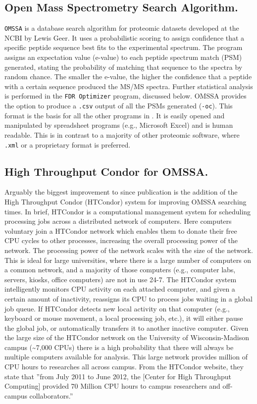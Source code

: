 \subsection*{Open Mass Spectrometry Search Algorithm.}
\texttt{OMSSA} is a database search algorithm for proteomic datasets developed at the NCBI by Lewis Geer.\cite{omssa} It uses a probabilistic scoring to assign confidence that a specific peptide sequence best fits to the experimental spectrum. The program assigns an expectation value (e-value) to each peptide spectrum match (PSM) generated, stating the probability of matching that sequence to the spectra by random chance. The smaller the e-value, the higher the confidence that a peptide with a certain sequence produced the MS/MS spectra. Further statistical analysis is performed in the \texttt{FDR Optimizer} program, discussed below. OMSSA provides the option to produce a \texttt{.csv} output of all the PSMs generated (\texttt{-oc}). This format is the basis for all the other programs in \compass{}. It is easily opened and manipulated by spreadsheet programs (e.g., Microsoft Excel) and is human readable. This is in contrast to a majority of other proteomic software, where \texttt{.xml} or a proprietary format is preferred.

\subsection*{High Throughput Condor for OMSSA.}
Arguably the biggest improvement to \compass{} since publication is the addition of the High Throughput Condor (HTCondor) system for improving OMSSA searching times. In brief, HTCondor is a computational management system for scheduling processing jobs across a distributed network of computers. Here computers voluntary join a HTCondor network which enables them to donate their free CPU cycles to other processes, increasing the overall processing power of the network. The processing power of the network scales with the size of the network. This is ideal for large universities, where there is a large number of computers on a common network, and a majority of those computers (e.g., computer labs, servers, kiosks, office computers) are not in use 24-7. The HTCondor system intelligently monitors CPU activity on each attached computer, and given a certain amount of inactivity, reassigns its CPU to process jobs waiting in a global job queue. If HTCondor detects new local activity on that computer (e.g., keyboard or mouse movement, a local processing job, etc.), it will either pause the global job, or automatically transfers it to another inactive computer. Given the large size of the HTCondor network on the University of Wisconsin-Madison campus (\textasciitilde7,000 CPUs) there is a high probability that there will always be multiple computers available for analysis. This large network provides million of CPU hours to researches all across campus. From the HTCondor website, they state that ''from July 2011 to June 2012, the [Center for High Throughput Computing] provided 70 Million CPU hours to campus researchers and off-campus collaborators.''

